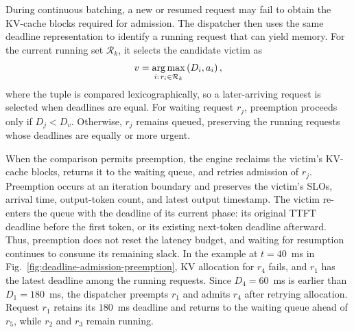 During continuous batching, a new or resumed request may fail to obtain the KV-cache blocks required for admission.
The dispatcher then uses the same deadline representation to identify a running request that can yield memory.
For the current running set $\mathcal{R}_k$, it selects the candidate victim as
\begin{equation}
\small
  v = \operatorname*{arg\,max}_{i:\,r_i \in \mathcal{R}_k}
      \left(D_i, a_i\right),
  \label{eq:deadline-preemption-victim}
\end{equation}
where the tuple is compared lexicographically, so a later-arriving request is selected when deadlines are equal.
For waiting request $r_j$, preemption proceeds only if $D_j < D_v$.
Otherwise, $r_j$ remains queued, preserving the running requests whose deadlines are equally or more urgent.

When the comparison permits preemption, the engine reclaims the victim's KV-cache blocks, returns it to the waiting queue, and retries admission of $r_j$.
Preemption occurs at an iteration boundary and preserves the victim's SLOs, arrival time, output-token count, and latest output timestamp.
The victim re-enters the queue with the deadline of its current phase: its original TTFT deadline before the first token, or its existing next-token deadline afterward.
Thus, preemption does not reset the latency budget, and waiting for resumption continues to consume its remaining slack.
In the example at $t=40$~ms in Fig.~\ref{fig:deadline-admission-preemption}, KV allocation for $r_4$ fails, and $r_1$ has the latest deadline among the running requests.
Since $D_4=60$~ms is earlier than $D_1=180$~ms, the dispatcher preempts $r_1$ and admits $r_4$ after retrying allocation.
Request $r_1$ retains its $180$~ms deadline and returns to the waiting queue ahead of $r_5$, while $r_2$ and $r_3$ remain running.
